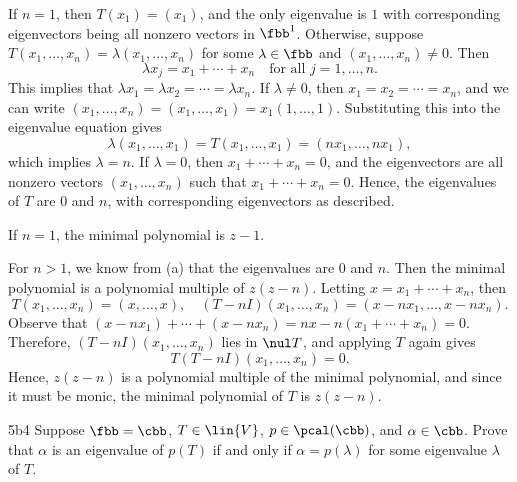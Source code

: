 \begin{solenum}
    \item If $n = 1$, then $T(x_1) = (x_1)$, and the only eigenvalue is $1$ with corresponding eigenvectors being all nonzero vectors in $\fbb^1$.
    Otherwise, suppose $T(x_1, \ldots, x_n) = \lambda (x_1, \ldots, x_n)$ for some $\lambda \in \fbb$ and $(x_1, \ldots, x_n) \neq 0$.
	Then
    \[
    	\lambda x_j = x_1 + \cdots + x_n \quad \text{for all } j = 1, \ldots, n.
    \]
    This implies that $\lambda x_1 = \lambda x_2 = \cdots = \lambda x_n$.
	If $\lambda \neq 0$, then $x_1 = x_2 = \cdots = x_n$, and we can write $(x_1, \ldots, x_n) = (x_1, \ldots, x_1) = x_1(1, \ldots, 1)$.
	Substituting this into the eigenvalue equation gives
    \[
    	\lambda (x_1, \ldots, x_1) = T(x_1, \ldots, x_1) = (nx_1, \ldots, nx_1),
    \]
    which implies $\lambda = n$.
	If $\lambda = 0$, then $x_1 + \cdots + x_n = 0$, and the eigenvectors are all nonzero vectors $(x_1, \ldots, x_n)$ such that $x_1 + \cdots + x_n = 0$.
	Hence, the eigenvalues of $T$ are $0$ and $n$, with corresponding eigenvectors as described.
    \item If $n=1$, the minimal polynomial is $z-1$.

    For $n>1$, we know from (a) that the eigenvalues are $0$ and $n$. Then the minimal polynomial is a polynomial multiple of $z(z - n)$. Letting $x = x_1 + \cdots + x_n$, then
    \[
    	T(x_1, \ldots, x_n) = (x, \ldots, x), \quad (T - nI)(x_1, \ldots, x_n) = (x - nx_1, \ldots, x - nx_n).
    \]
    Observe that $(x - nx_1) + \cdots + (x - nx_n) = nx - n(x_1 + \cdots + x_n) = 0$.
	Therefore, $(T - nI)(x_1, \ldots, x_n)$ lies in $\nul T$, and applying $T$ again gives
    \[
    	T(T - nI)(x_1, \ldots, x_n) = 0.
    \]
    Hence, $z(z - n)$ is a polynomial multiple of the minimal polynomial, and since it must be monic, the minimal polynomial of $T$ is $z(z-n)$.
\end{solenum}

\begin{exercise}{5b4}
    Suppose $\fbb = \cbb$, $T \in \lin{V}$, $p \in \pcal(\cbb)$, and $\alpha \in \cbb$.
	Prove that $\alpha$ is an eigenvalue of $p(T)$ if and only if $\alpha = p(\lambda)$ for some eigenvalue $\lambda$ of $T$.
\end{exercise}

